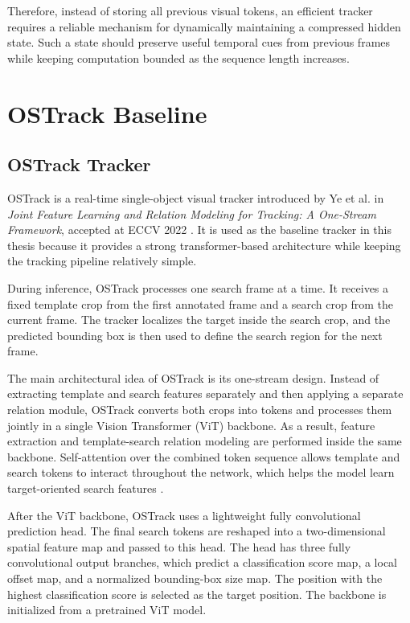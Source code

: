 \documentclass[bachelorthesis]{fer}
\numberwithin{equation}{chapter}
\begin{document}
    Therefore, instead of storing all previous visual tokens, an efficient tracker requires
    a reliable mechanism for dynamically maintaining a compressed hidden state. Such a state
    should preserve useful temporal cues from previous frames while keeping computation
    bounded as the sequence length increases.


    \chapter{OSTrack Baseline}\label{ostrack-baseline}


    \section{OSTrack Tracker}\label{ostrack-tracker}

    OSTrack is a real-time single-object visual tracker introduced by Ye et al. in \emph{Joint Feature Learning and Relation
    Modeling for Tracking: A One-Stream Framework}, accepted at ECCV 2022 \cite{ye2022ostrack}. It is used as the baseline
    tracker in this thesis because it provides a strong transformer-based architecture while keeping the tracking pipeline relatively
    simple.

    During inference, OSTrack processes one search frame at a time. It receives a fixed template crop from the first
    annotated frame and a search crop from the current frame. The tracker localizes the target inside the search crop, and
    the predicted bounding box is then used to define the search region for the next frame.

    The main architectural idea of OSTrack is its one-stream design. Instead of extracting template and search features
    separately and then applying a separate relation module, OSTrack converts both crops into tokens and processes them
    jointly in a single Vision Transformer (ViT) backbone. As a result, feature extraction and template-search relation
    modeling
    are performed inside the same backbone. Self-attention over the combined token sequence allows template and search
    tokens to interact throughout the network, which helps the model learn target-oriented search features \cite{ye2022ostrack}.

    After the ViT backbone, OSTrack uses a lightweight fully convolutional prediction head. The final search tokens are
    reshaped into a two-dimensional spatial feature map and passed to this head. The head has three fully convolutional
    output branches, which predict a classification score map, a local offset map, and a normalized bounding-box size map.
    The position with the highest classification score is selected as the target position.
    The backbone is initialized from a pretrained ViT model.
\end{document}
